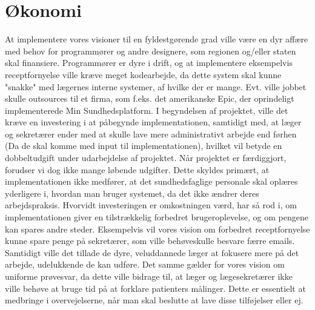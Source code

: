 \section{Økonomi}
At implementere vores visioner til en fyldestgørende grad ville være en dyr affære med behov for programmører og andre designere, som regionen og/eller staten skal finansiere. Programmører er dyre i drift, og at implementere eksempelvis receptfornyelse ville kræve meget kodearbejde, da dette system skal kunne "snakke" med lægernes interne systemer, af hvilke der er mange. Evt. ville jobbet skulle outsources til et firma, som f.eks. det amerikanske Epic, der oprindeligt implementerede Min Sundhedsplatform. I begyndelsen af projektet, ville det kræve en investering i at påbegynde implementationen, samtidigt med, at læger og sekretærer ender med at skulle lave mere administrativt arbejde end førhen (Da de skal komme med input til implementationen), hvilket vil betyde en dobbeltudgift under udarbejdelse af projektet. Når projektet er færdiggjort, forudser vi dog ikke mange løbende udgifter. Dette skyldes primært, at implementationen ikke medfører, at det sundhedsfaglige personale skal oplæres yderligere i, hvordan man bruger systemet, da det ikke ændrer deres arbejdspraksis. Hvorvidt investeringen er omkostningen værd, har så rod i, om implementationen giver en tilstrækkelig forbedret brugeroplevelse, og om pengene kan spares andre steder. Eksempelvis vil vores vision om forbedret receptfornyelse kunne spare penge på sekretærer, som ville behøveskulle besvare færre emails. Samtidigt ville det tillade de dyre, veluddannede læger at fokusere mere på det arbejde, udelukkende de kan udføre. Det samme gælder for vores vision om uniforme prøvesvar, da dette ville bidrage til, at læger og lægesekretærer ikke ville behøve at bruge tid på at forklare patienters målinger. Dette er essentielt at medbringe i overvejelserne, når man skal beslutte at lave disse tilføjelser eller ej. 
